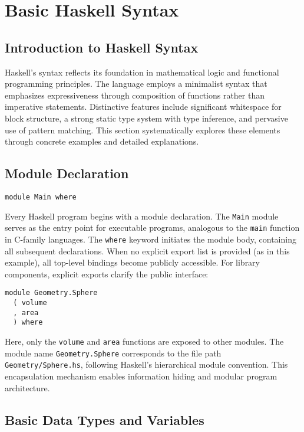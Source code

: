 \documentclass{book}
\begin{document}
\chapter{Basic Haskell Syntax}
\label{chap:haskell-syntax}

\section{Introduction to Haskell Syntax}
Haskell's syntax reflects its foundation in mathematical logic and functional programming principles. The language employs a minimalist syntax that emphasizes expressiveness through composition of functions rather than imperative statements. Distinctive features include significant whitespace for block structure, a strong static type system with type inference, and pervasive use of pattern matching. This section systematically explores these elements through concrete examples and detailed explanations.

\section{Module Declaration}
\label{sec:modules}

\begin{lstlisting}
module Main where
\end{lstlisting}

Every Haskell program begins with a module declaration. The \texttt{Main} module serves as the entry point for executable programs, analogous to the \texttt{main} function in C-family languages. The \texttt{where} keyword initiates the module body, containing all subsequent declarations. When no explicit export list is provided (as in this example), all top-level bindings become publicly accessible. For library components, explicit exports clarify the public interface:

\begin{lstlisting}
module Geometry.Sphere 
  ( volume
  , area
  ) where
\end{lstlisting}

Here, only the \texttt{volume} and \texttt{area} functions are exposed to other modules. The module name \texttt{Geometry.Sphere} corresponds to the file path \texttt{Geometry/Sphere.hs}, following Haskell's hierarchical module convention. This encapsulation mechanism enables information hiding and modular program architecture.

\section{Basic Data Types and Variables}
\label{sec:types}
\end{document}
